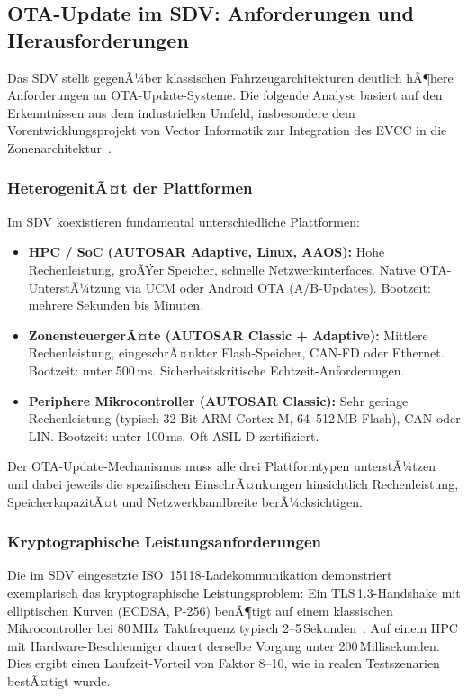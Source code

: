 ﻿\documentclass[12pt,a4paper,twoside]{article}
\begin{document}
\subsection{OTA-Update im SDV: Anforderungen und Herausforderungen}
\label{subsec:ota_sdv_anforderungen}

Das SDV stellt gegenÃ¼ber klassischen Fahrzeugarchitekturen deutlich hÃ¶here
Anforderungen an OTA-Update-Systeme. Die folgende Analyse basiert auf den
Erkenntnissen aus dem industriellen Umfeld, insbesondere dem Vorentwicklungsprojekt
von Vector Informatik zur Integration des EVCC in die Zonenarchitektur~\cite{schneider2026ladekomm}.

\subsubsection{HeterogenitÃ¤t der Plattformen}

Im SDV koexistieren fundamental unterschiedliche Plattformen:

\begin{itemize}
  \item \textbf{HPC / SoC (AUTOSAR Adaptive, Linux, AAOS):} Hohe Rechenleistung,
    groÃŸer Speicher, schnelle Netzwerkinterfaces. Native OTA-UnterstÃ¼tzung via UCM
    oder Android OTA (A/B-Updates). Bootzeit: mehrere Sekunden bis Minuten.
  \item \textbf{ZonensteuergerÃ¤te (AUTOSAR Classic + Adaptive):} Mittlere
    Rechenleistung, eingeschrÃ¤nkter Flash-Speicher, CAN-FD oder Ethernet.
    Bootzeit: unter 500\,ms. Sicherheitskritische Echtzeit-Anforderungen.
  \item \textbf{Periphere Mikrocontroller (AUTOSAR Classic):} Sehr geringe
    Rechenleistung (typisch 32-Bit ARM Cortex-M, 64--512\,MB Flash), CAN oder LIN.
    Bootzeit: unter 100\,ms. Oft ASIL-D-zertifiziert.
\end{itemize}

Der OTA-Update-Mechanismus muss alle drei Plattformtypen unterstÃ¼tzen und dabei
jeweils die spezifischen EinschrÃ¤nkungen hinsichtlich Rechenleistung,
SpeicherkapazitÃ¤t und Netzwerkbandbreite berÃ¼cksichtigen.

\subsubsection{Kryptographische Leistungsanforderungen}

Die im SDV eingesetzte ISO~15118-Ladekommunikation demonstriert exemplarisch
das kryptographische Leistungsproblem: Ein TLS\,1.3-Handshake mit elliptischen
Kurven (ECDSA, P-256) benÃ¶tigt auf einem klassischen Mikrocontroller bei
80\,MHz Taktfrequenz typisch 2--5\,Sekunden~\cite{schneider2026ladekomm}.
Auf einem HPC mit Hardware-Beschleuniger dauert derselbe Vorgang unter
200\,Millisekunden. Dies ergibt einen Laufzeit-Vorteil von Faktor 8--10,
wie in realen Testszenarien bestÃ¤tigt wurde.
\end{document}
